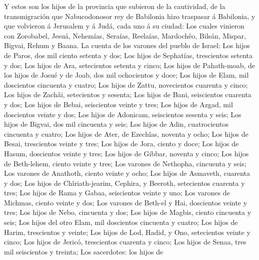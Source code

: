  Y estos son los hijos de la provincia que subieron de la
cautividad, de la transmigración que Nabucodonosor rey de Babilonia hizo
traspasar á Babilonia, y que volvieron á Jerusalem y á Judá, cada uno á
su ciudad:  Los cuales vinieron con Zorobabel, Jesuá,
Nehemías, Seraías, Reelaías, Mardochêo, Bilsán, Mispar, Bigvai, Rehum y
Baana. La cuenta de los varones del pueblo de Israel:  Los
hijos de Paros, dos mil ciento setenta y dos;  Los hijos
de Sephatías, trescientos setenta y dos;  Los hijos de
Ara, setecientos setenta y cinco;  Los hijos de
Pahath-moab, de los hijos de Josué y de Joab, dos mil ochocientos y
doce;  Los hijos de Elam, mil doscientos cincuenta y
cuatro;  Los hijos de Zattu, novecientos cuarenta y cinco;
 Los hijos de Zachâi, setecientos y sesenta;
 Los hijos de Bani, seiscientos cuarenta y dos;
 Los hijos de Bebai, seiscientos veinte y tres;
 Los hijos de Azgad, mil doscientos veinte y dos;
 Los hijos de Adonicam, seiscientos sesenta y seis;
 Los hijos de Bigvai, dos mil cincuenta y seis;
 Los hijos de Adin, cuatrocientos cincuenta y cuatro;
 Los hijos de Ater, de Ezechîas, noventa y ocho;
 Los hijos de Besai, trescientos veinte y tres;
 Los hijos de Jora, ciento y doce;  Los
hijos de Hasum, doscientos veinte y tres;  Los hijos de
Gibbar, noventa y cinco;  Los hijos de Beth-lehem, ciento
veinte y tres;  Los varones de Nethopha, cincuenta y
seis;  Los varones de Anathoth, ciento veinte y ocho;
 Los hijos de Asmaveth, cuarenta y dos; 
Los hijos de Chîriath-jearim, Cephira, y Beeroth, setecientos cuarenta y
tres;  Los hijos de Rama y Gabaa, seiscientos veinte y
uno;  Los varones de Michmas, ciento veinte y dos;
 Los varones de Beth-el y Hai, doscientos veinte y tres;
 Los hijos de Nebo, cincuenta y dos;  Los
hijos de Magbis, ciento cincuenta y seis;  Los hijos del
otro Elam, mil doscientos cincuenta y cuatro;  Los hijos
de Harim, trescientos y veinte;  Los hijos de Lod, Hadid,
y Ono, setecientos veinte y cinco;  Los hijos de Jericó,
trescientos cuarenta y cinco;  Los hijos de Senaa, tres
mil seiscientos y treinta;  Los sacerdotes: los hijos de
